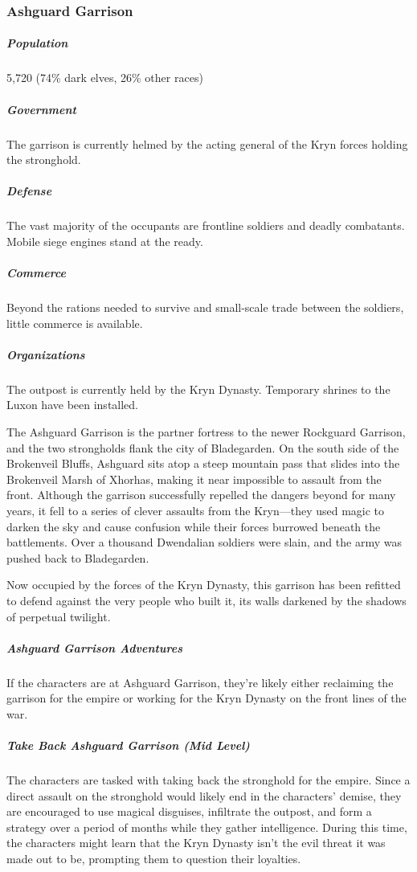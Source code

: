 \documentclass[10pt,a4paper,twoside,bg=print,twocolumn,openany,nodeprecatedcode]{dndbook}
\begin{document}
\subsubsection{Ashguard Garrison}
\subparagraph{Population}
5,720 (74\% dark elves, 26\% other races)

\subparagraph{Government}
The garrison is currently helmed by the acting general of the Kryn forces holding the stronghold.

\subparagraph{Defense}
The vast majority of the occupants are frontline soldiers and deadly combatants. Mobile siege engines stand at the ready.

\subparagraph{Commerce}
Beyond the rations needed to survive and small-scale trade between the soldiers, little commerce is available.

\subparagraph{Organizations}
The outpost is currently held by the Kryn Dynasty. Temporary shrines to the Luxon have been installed.

The Ashguard Garrison is the partner fortress to the newer Rockguard Garrison, and the two strongholds flank the city of Bladegarden. On the south side of the Brokenveil Bluffs, Ashguard sits atop a steep mountain pass that slides into the Brokenveil Marsh of Xhorhas, making it near impossible to assault from the front. Although the garrison successfully repelled the dangers beyond for many years, it fell to a series of clever assaults from the Kryn—they used magic to darken the sky and cause confusion while their forces burrowed beneath the battlements. Over a thousand Dwendalian soldiers were slain, and the army was pushed back to Bladegarden.

Now occupied by the forces of the Kryn Dynasty, this garrison has been refitted to defend against the very people who built it, its walls darkened by the shadows of perpetual twilight.

\subparagraph{Ashguard Garrison Adventures}
If the characters are at Ashguard Garrison, they're likely either reclaiming the garrison for the empire or working for the Kryn Dynasty on the front lines of the war.

\subparagraph{Take Back Ashguard Garrison (Mid Level)}
The characters are tasked with taking back the stronghold for the empire. Since a direct assault on the stronghold would likely end in the characters' demise, they are encouraged to use magical disguises, infiltrate the outpost, and form a strategy over a period of months while they gather intelligence. During this time, the characters might learn that the Kryn Dynasty isn't the evil threat it was made out to be, prompting them to question their loyalties.
\end{document}
